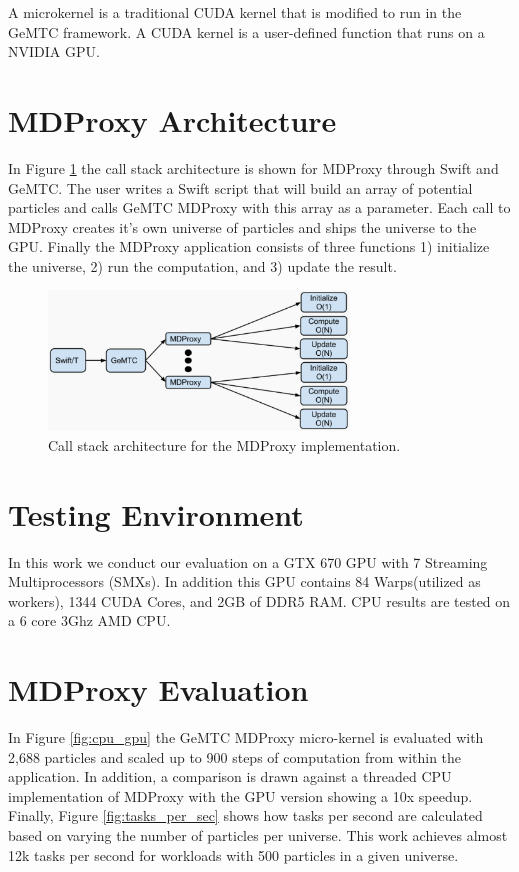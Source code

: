 \documentclass[conference]{IEEEtran}
\begin{document}
A microkernel is a traditional CUDA kernel that is modified to run in the GeMTC framework. A CUDA kernel is a user-defined function that runs on a NVIDIA GPU.

\section{MDProxy Architecture}
In Figure \ref{fig:md_proxy_arch} the call stack architecture is shown for MDProxy through Swift and GeMTC. The user writes a Swift script that will build an array of potential particles and calls GeMTC MDProxy with this array as a parameter. Each call to MDProxy creates it's own universe of particles and ships the universe to the GPU. Finally the MDProxy application consists of three functions 1) initialize the universe, 2) run the computation, and 3) update the result.

\begin{figure}[h]
\centering\includegraphics[width=8cm]{imgs/md_proxy_arch.png}
\caption{Call stack architecture for the MDProxy implementation.}
\label{fig:md_proxy_arch}
\end{figure}


\section{Testing Environment}
In this work we conduct our evaluation on a GTX 670 GPU with 7 Streaming Multiprocessors (SMXs). In addition this GPU contains 84 Warps(utilized as workers), 1344 CUDA Cores, and 2GB of DDR5 RAM. CPU results are tested on a 6 core 3Ghz AMD CPU.

\section{MDProxy Evaluation}

In Figure \ref{fig:cpu_gpu} the GeMTC MDProxy micro-kernel is evaluated with 2,688 particles and scaled up to 900 steps of computation from within the application. In addition, a comparison is drawn against a threaded CPU implementation of MDProxy with the GPU version showing a 10x speedup. Finally, Figure \ref{fig:tasks_per_sec} shows how tasks per second are calculated based on varying the number of particles per universe. This work achieves almost 12k tasks per second for workloads with 500 particles in a given universe.
\end{document}
